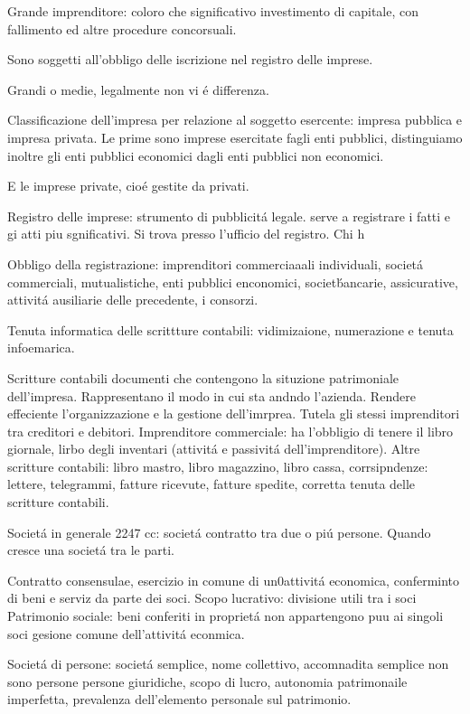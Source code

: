 \documentclass{article}
\begin{document}
Grande imprenditore: coloro che significativo investimento di capitale, con fallimento ed altre procedure concorsuali.

Sono soggetti all'obbligo delle iscrizione nel registro delle imprese.

Grandi o medie, legalmente non vi \'e differenza.

Classificazione dell'impresa per relazione al soggetto esercente: impresa pubblica e impresa privata.
Le prime sono imprese esercitate fagli enti pubblici, distinguiamo inoltre gli enti pubblici economici dagli enti pubblici non economici.

E le imprese private, cio\'e gestite da privati.


Registro delle imprese:
strumento di pubblicit\'a legale. serve a registrare i fatti e gi atti pi\0u sgnificativi. Si trova presso l'ufficio del registro. Chi h 

Obbligo della registrazione: imprenditori commerciaaali individuali, societ\'a commerciali, mutualistiche, enti pubblici enconomici, societ\' bancarie, assicurative, attivit\'a ausiliarie delle precedente, i consorzi. 

Tenuta informatica delle scrittture contabili: vidimizaione, numerazione e tenuta infoemarica.

Scritture contabili
documenti che contengono la situzione patrimoniale dell'impresa. Rappresentano il modo in cui sta andndo l'azienda. Rendere effeciente l'organizzazione e la gestione dell'imrprea. Tutela gli stessi imprenditori tra creditori e debitori. 
Imprenditore commerciale: ha l'obbligio di tenere il libro giornale, lirbo degli inventari (attivit\'a e passivit\'a dell'imprenditore). 
Altre scritture contabili: libro mastro, libro magazzino, libro cassa, corrsipndenze: lettere, telegrammi, fatture ricevute, fatture spedite, corretta tenuta delle scritture contabili.



Societ\'a in generale
2247 cc: societ\'a contratto tra due o pi\'u persone. Quando cresce una societ\'a  tra le parti.

Contratto consensulae, esercizio in comune di un0attivit\'a economica, conferminto di beni e serviz da parte dei soci. 
Scopo lucrativo: divisione utili tra i soci
Patrimonio sociale: beni conferiti in propriet\'a non appartengono pu\0u ai singoli soci
gesione comune dell'attivit\'a econmica.


Societ\'a di persone: societ\'a semplice, nome collettivo, accomnadita semplice
non sono persone persone giuridiche, scopo di lucro, autonomia patrimonaile imperfetta, prevalenza dell'elemento personale sul patrimonio. 
\end{document}
